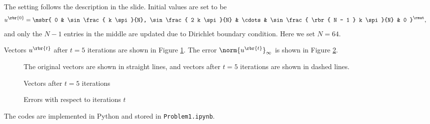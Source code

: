 \documentclass[english, nochinese]{pkupaper}
\title{\titlemark}
\author{\authoring}
\begin{document}
\maketitle

\begin{thmquestion}
\ 
\begin{thmanswer}
The setting follows the description in the slide. Initial values are set to be
\begin{equation}
u^{\rbr{0}} = \msbr{ 0 & \sin \frac{ k \spi }{N}, \sin \frac{ 2 k \spi }{N} & \cdots & \sin \frac{ \rbr{ N - 1 } k \spi }{N} & 0 }^{\rmut},
\end{equation}
and only the $ N - 1 $ entries in the middle are updated due to Dirichlet boundary condition. Here we set $ N = 64 $.

Vectors $u^{\rbr{t}}$ after $ t = 5 $ iterations are shown in Figure \ref{Fig:Vec}. The error $\norm{u^{\rbr{t}}}_{\infty}$ is shown in Figure \ref{Fig:Err}.

\begin{figure}[htbp]
{
\centering
\scalebox{0.8}{}
\caption{Vectors after $ t = 5 $ iterations}
\label{Fig:Vec}
}
{
\footnotesize
The original vectors are shown in straight lines, and vectors after $ t = 5 $ iterations are shown in dashed lines.
}
\end{figure}

\begin{figure}[htbp]
\centering
\scalebox{0.8}{}
\caption{Errors with respect to iterations $t$}
\label{Fig:Err}
\end{figure}

The codes are implemented in Python and stored in \verb"Problem1.ipynb".
\end{thmanswer}
\end{thmquestion}
\end{document}
